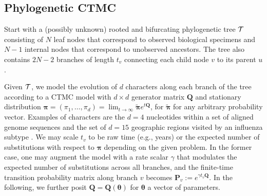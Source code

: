 \documentclass[9pt,twocolumn,twoside]{pnas-new}
\newcommand{\phylogeny}{{\cal T}}
\newcommand{\?}{\textbf{?}}
\newcommand{\QQ}{\mathbf{Q}}
\newcommand{\ttheta}{\boldsymbol{\theta}}
\newcommand{\ppi}{\boldsymbol{\pi}}
\renewcommand{\P}{\mathbf{P}}
\begin{document}
\subsection*{Phylogenetic CTMC}

Start with a (possibly unknown) rooted and bifurcating phylogenetic
tree $\phylogeny$ consisting of $N$ leaf nodes that correspond to
observed biological specimens and $N-1$ internal nodes that correspond
to unobserved ancestors.  The tree also contains $2N-2$ branches of
length $t_v$ connecting each child node $v$ to its parent $u$.

Given $\phylogeny$, we model the evolution of $d$ characters along
each branch of the tree according to a CTMC model with $d\times d$
generator matrix $\QQ$ and stationary distribution
$\ppi=(\pi_1,\dots,\pi_d)=\lim_{t\rightarrow
  \infty}\widetilde{\ppi}e^{t\QQ}$, for $\widetilde{\ppi}$ for any
arbitrary probability vector.  Examples of characters are the $d=4$
nucleotides within a set of aligned genome sequences
\cite{jukes1969evolution} and the set of $d=15$ geographic regions
visited by an influenza subtype \cite{lemey2014unifying}.  We may
scale $t_v$ to be raw time (e.g., years) or the expected number of
substitutions with respect to $\ppi$ depending on the given problem.
In the former case, one may augment the model with a rate scalar
$\gamma$ that modulates the expected number of substitutions across
all branches, and the finite-time transition probability matrix along
branch $v$ becomes $\P_v:=e^{\gamma t_v \QQ}$.  In the following, we
further posit $\QQ=\QQ(\ttheta)$ for $\ttheta$ a vector of parameters.
 
\end{document}
